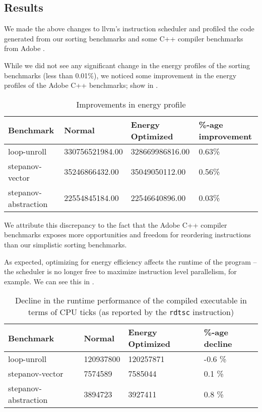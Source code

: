 \subsection{Results}

We made the above changes to llvm's instruction scheduler and profiled
the code generated from our sorting benchmarks and some C++ compiler
benchmarks from Adobe \cite{adobe-cpp}.

While we did not see any significant change in the energy profiles of
the sorting benchmarks (less than 0.01\%), we noticed some improvement
in the energy profiles of the Adobe C++ benchmarks; show in
.

\begin{table}[htbp]
  \begin{tabular}{l | l | l | l}
    \textbf{Benchmark} & \textbf{Normal} &
    \textbf{Energy Optimized} & \textbf{\%-age improvement} \\ \hline

    loop-unroll & 330756521984.00 & 328669986816.00 & 0.63\% \\
    stepanov-vector & 35246866432.00 & 35049050112.00 & 0.56\% \\
    stepanov-abstraction & 22554845184.00 & 22546640896.00 & 0.03\%
  \end{tabular}
  \caption{Improvements in energy profile}
  \label{fig:improvements}
\end{table}

We attribute this discrepancy to the fact that the Adobe C++ compiler
benchmarks exposes more opportunities and freedom for reordering
instructions than our simplistic sorting benchmarks.

As expected, optimizing for energy efficiency affects the runtime of
the program -- the scheduler is no longer free to maximize instruction
level parallelism, for example.  We can see this in
.

\begin{table}[htbp]
  \begin{tabular}{l | l | l | l}
    \textbf{Benchmark} & \textbf{Normal} &
    \textbf{Energy Optimized} & \textbf{\%-age decline} \\ \hline
    
    loop-unroll & 120937800 & 120257871 & -0.6 \% \\
    stepanov-vector & 7574589 & 7585044 & 0.1 \% \\
    stepanov-abstraction & 3894723 & 3927411 & 0.8 \%
  \end{tabular}
  \caption{Decline in the runtime performance of the compiled
    executable in terms of CPU ticks (as reported by the
    \texttt{rdtsc} instruction)}
  \label{fig:performance-cost}
\end{table}

